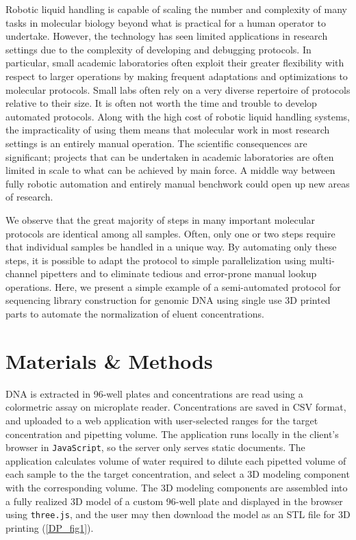 \begin{refsection}
Robotic liquid handling is capable of scaling the number and complexity of many tasks in molecular biology beyond what is practical for a human operator to undertake. However, the technology has seen limited applications in research settings due to the complexity of developing and debugging protocols. In particular, small academic laboratories often exploit their greater flexibility with respect to larger operations by making frequent adaptations and optimizations to molecular protocols. Small labs often rely on a very diverse repertoire of protocols relative to their size. It is often not worth the time and trouble to develop automated protocols. Along with the high cost of robotic liquid handling systems, the impracticality of using them means that molecular work in most research settings is an entirely manual operation. The scientific consequences are significant; projects that can be undertaken in academic laboratories are often limited in scale to what can be achieved by main force. A middle way between fully robotic automation and entirely manual benchwork could open up new areas of research.

We observe that the great majority of steps in many important molecular protocols are identical among all samples. Often, only one or two steps require that individual samples be handled in a unique way. By automating only these steps, it is possible to adapt the protocol to simple parallelization using multi-channel pipetters and to eliminate tedious and error-prone manual lookup operations. Here, we present a simple example of a semi-automated protocol for sequencing library construction for genomic DNA using single use 3D printed parts to automate the normalization of eluent concentrations.

\section{Materials \& Methods}

DNA is extracted in 96-well plates and concentrations are read using a colormetric assay on microplate reader. Concentrations are saved in CSV format, and uploaded to a web application with user-selected ranges for the target concentration and pipetting volume. The application runs locally in the client's browser in {\tt JavaScript}, so the server only serves static documents. The application calculates volume of water required to dilute each pipetted volume of each sample to the the target concentration, and select a 3D modeling component with the corresponding volume. The 3D modeling components are assembled into a fully realized 3D model of a custom 96-well plate and displayed in the browser using {\tt three.js}, \cite{cabello2010three} and the user may then download the model as an STL file for 3D printing (\ref{DP_fig1}). 


\end{refsection}
